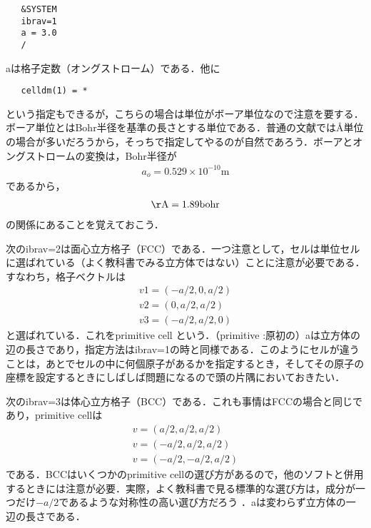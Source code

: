 \documentclass[a4j]{jarticle}
\begin{document}
  \begin{lstlisting}
   &SYSTEM
   ibrav=1
   a = 3.0
   /
  \end{lstlisting}
  aは格子定数（オングストローム）である．他に
  \begin{lstlisting}
   celldm(1) = *
  \end{lstlisting}
  という指定もできるが，こちらの場合は単位がボーア単位なので注意を要する．ボーア単位とはBohr半径を基準の長さとする単位である．普通の文献ではÅ単位の場合が多いだろうから，そっちで指定してやるのが自然であろう．ボーアとオングストロームの変換は，Bohr半径が
\begin{align*}
a_o=0.529\times 10^{-10}\mathrm{m}
\end{align*}
であるから，
\begin{align*}
 \mathrm{\AA}=1.89\mathrm{bohr}
\end{align*}
の関係にあることを覚えておこう．
  

  
  次のibrav=2は面心立方格子（FCC）である．一つ注意として，セルは単位セルに選ばれている（よく教科書でみる立方体ではない）ことに注意が必要である．すなわち，格子ベクトルは
  \begin{align*}
   v1=(-a/2,0,a/2) \\
   v2=(0,a/2,a/2) \\
   v3=(-a/2,a/2,0)
  \end{align*}
  と選ばれている．これをprimitive cell という．（primitive :原初の）aは立方体の辺の長さであり，指定方法はibrav=1の時と同様である．このようにセルが違うことは，あとでセルの中に何個原子があるかを指定するとき，そしてその原子の座標を設定するときにしばしば問題になるので頭の片隅においておきたい．

  次のibrav=3は体心立方格子（BCC）である．これも事情はFCCの場合と同じであり，primitive cellは
  \begin{align*}
   v=(a/2,a/2,a/2) \\
   v=(-a/2,a/2,a/2) \\
   v=(-a/2,-a/2,a/2)
  \end{align*}
  である．BCCはいくつかのprimitive cellの選び方があるので，他のソフトと併用するときには注意が必要．実際，よく教科書で見る標準的な選び方は，成分が一つだけ$-a/2$であるような対称性の高い選び方だろう
  ．aは変わらず立方体の一辺の長さである．
\end{document}
